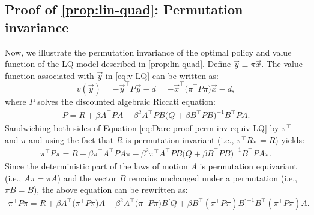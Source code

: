 \documentclass[12pt]{article}
\begin{document}
\subsection{Proof of \cref{prop:lin-quad}: Permutation invariance}\label{sec:lq-permutation-invariance}

Now, we illustrate the permutation invariance of the optimal policy and value function of the LQ model described in \cref{prop:lin-quad}. Define $\vec{y} \equiv \pi \vec{x}$. The value function associated with $\vec{y}$ in \cref{eq:v-LQ} can be written as:
\begin{equation*}
v(\vec{y}) = -\vec{y}^\top P \vec{y}-d = - \vec{x}^\top\big( \pi^\top P \pi\big) \vec{x} -d,
\end{equation*}
where $P$ solves the discounted algebraic Riccati equation: 
\begin{align}
\label{eq:Dare-proof-perm-inv-equiv-LQ}
P = R + \beta A^\top P A - \beta^2 A^\top P B \big(Q+\beta B^\top P B\big)^{-1} B^\top P A.
\end{align}
Sandwiching both sides of Equation \cref{eq:Dare-proof-perm-inv-equiv-LQ} by $\pi^\top$ and $\pi$ and using the fact that $R$ is permutation invariant (i.e., $\pi^\top R \pi = R$) yields:
\begin{align*}
\pi^\top P \pi = R +\beta \pi^\top A^\top P A \pi- \beta^2 \pi^\top A^\top P B \big(Q+\beta B^\top P B\big)^{-1} B^\top P A\pi.
\end{align*}
Since the deterministic part of the laws of motion $A$ is permutation equivariant (i.e., $A\pi = \pi A$) and the vector $B$ remains unchanged under a permutation (i.e., $\pi B = B$), the above equation can be rewritten as:
\begin{align}
\pi^\top P \pi = R +\beta A^\top \big(\pi^\top P \pi\big) A - \beta^2  A^\top \big(\pi^\top P \pi \big) B \big[Q+\beta B^\top (\pi^\top P\pi) B\big]^{-1} B^\top (\pi^\top P\pi) A.
\end{align}
\end{document}

